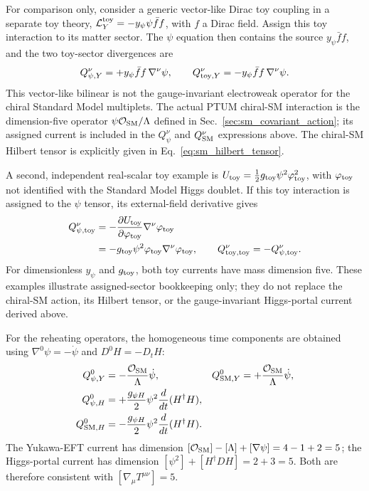 \documentclass[epj]{svjour}
\begin{document}
For comparison only, consider a generic vector-like Dirac toy
coupling in a separate toy theory,
\(\mathcal{L}_{Y}^{\rm toy}=-y_\psi\psi\bar f f\), with \(f\) a
Dirac field. Assign this toy interaction to its matter sector. The
\(\psi\) equation then contains the source \(y_\psi\bar f f\), and
the two toy-sector divergences are
\begin{equation}
Q_{\psi,Y}^{\nu}
=+y_\psi\bar f f\,\nabla^\nu\psi,\qquad
Q_{{\rm toy},Y}^{\nu}
=-y_\psi\bar f f\,\nabla^\nu\psi.
\end{equation}
This vector-like bilinear is not the gauge-invariant electroweak
operator for the chiral Standard Model multiplets. The actual PTUM
chiral-SM interaction is the dimension-five operator
\(\psi\mathcal O_{\rm SM}/\Lambda\) defined in
Sec.~\ref{sec:sm_covariant_action}; its assigned current is included
in the \(Q_\psi^\nu\) and \(Q_{\rm SM}^\nu\) expressions above.
The chiral-SM Hilbert tensor is explicitly given in
Eq.~\eqref{eq:sm_hilbert_tensor}.

A second, independent real-scalar toy example is
\(U_{\rm toy}=\tfrac12g_{\rm toy}\psi^2\varphi_{\rm toy}^2\),
with \(\varphi_{\rm toy}\) not identified with the Standard Model
Higgs doublet. If this toy interaction is assigned to the \(\psi\)
tensor, its external-field derivative gives
\begin{align}
Q_{\psi,{\rm toy}}^\nu
&=-\frac{\partial U_{\rm toy}}{\partial\varphi_{\rm toy}}
\nabla^\nu\varphi_{\rm toy}\nonumber\\
&=-g_{\rm toy}\psi^2\varphi_{\rm toy}
\nabla^\nu\varphi_{\rm toy},\qquad
Q_{{\rm toy},{\rm toy}}^\nu=-Q_{\psi,{\rm toy}}^\nu.
\end{align}
For dimensionless \(y_\psi\) and \(g_{\rm toy}\), both toy currents
have mass dimension five. These examples illustrate assigned-sector
bookkeeping only; they do not replace the chiral-SM action, its
Hilbert tensor, or the gauge-invariant Higgs-portal current derived
above.

For the reheating operators, the homogeneous time components
are obtained using $\nabla^0\psi=-\dot\psi$ and
$D^0H=-D_tH$:
\begin{align}
Q_{\psi,Y}^0&=-\frac{\mathcal O_{\rm SM}}{\Lambda}\dot\psi,
&
Q_{{\rm SM},Y}^0&=+\frac{\mathcal O_{\rm SM}}{\Lambda}\dot\psi,
\\
Q_{\psi,H}^0&=+\frac{g_{\psi H}}{2}\psi^2
\frac{d}{dt}(H^\dagger H),\nonumber\\
Q_{{\rm SM},H}^0&=-\frac{g_{\psi H}}{2}\psi^2
\frac{d}{dt}(H^\dagger H).
\end{align}
The Yukawa-EFT current has dimension
$[\mathcal O_{\rm SM}]-[\Lambda]+[\nabla\psi]=4-1+2=5$;
the Higgs-portal current has dimension
$[\psi^2]+[H^\dagger D H]=2+3=5$. Both are therefore consistent
with $[\nabla_\mu T^{\mu\nu}]=5$.
\end{document}
